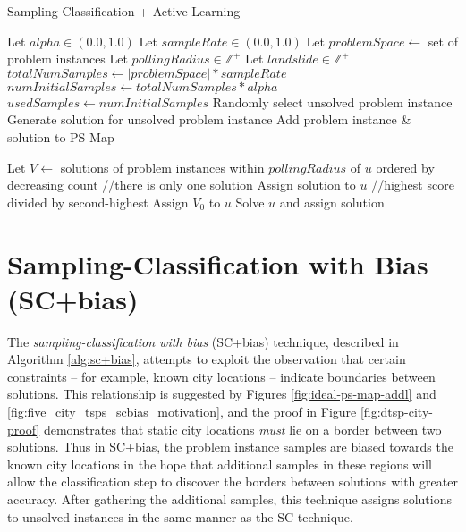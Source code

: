 \begin{algorithm}
  \caption{Sampling-Classification + Active Learning}   
  \label{alg:sc+al}
  \small
  \begin{algorithmic}[1] %
    \State Let $alpha \in (0.0,1.0)$
    \State Let $sampleRate \in (0.0,1.0)$
    \State Let $problemSpace \leftarrow$ set of problem instances
    \State Let $pollingRadius \in \mathbb{Z}^+$ 
    \State Let $landslide \in  \mathbb{Z}^+$ 
    \State $totalNumSamples \leftarrow |problemSpace| * sampleRate$
    \State $numInitialSamples \leftarrow totalNumSamples * alpha$ 
    \State $usedSamples  \leftarrow numInitialSamples$
      \State Randomly select unsolved problem instance
      \State Generate solution for unsolved problem instance
      \State Add problem instance \& solution to PS Map
    \EndFor
  
       \State Let $V \leftarrow$ solutions of problem instances within $pollingRadius$ of $u$ ordered by decreasing count
        \hspace{60pt} //there is only one solution
         \State Assign solution to $u$
        \hspace{35pt} //highest score divided by second-highest
          \State Assign $V_0$ to $u$
          \State Solve $u$ and assign solution
        \Else
        \EndIf
      \EndFor

  \end{algorithmic}
\end{algorithm}


\section{Sampling-Classification with Bias (SC+bias)}

The \textit{sampling-classification with bias} (SC+bias) technique, described in Algorithm \ref{alg:sc+bias}, attempts to exploit the observation that certain constraints -- for example, known city locations -- indicate boundaries between solutions.  This relationship is suggested by Figures \ref{fig:ideal-ps-map-addl} and \ref{fig:five_city_tsps_scbias_motivation}, and the proof in Figure \ref{fig:dtsp-city-proof} demonstrates that static city locations \textit{must} lie on a border between two solutions.  Thus in SC+bias, the problem instance  samples are biased towards the known city locations in the hope that additional samples in these regions will allow the classification step to discover the borders between solutions with greater accuracy. After gathering the additional samples, this technique assigns solutions to unsolved instances in the same manner as the SC technique.

